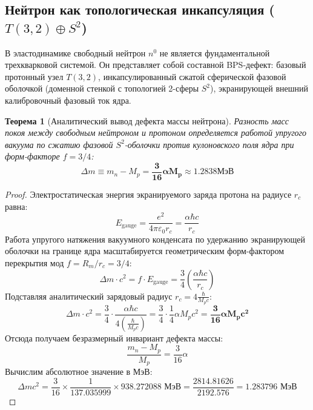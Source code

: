 \documentclass[12pt,a4paper]{article}
\newtheorem{theorem}{Теорема}
\begin{document}
\subsection{Нейтрон как топологическая инкапсуляция ($T(3,2) \oplus S^2$)}
В эластодинамике свободный нейтрон $n^0$ не является фундаментальной трехкварковой системой. Он представляет собой составной BPS-дефект: базовый протонный узел $T(3,2)$, инкапсулированный сжатой сферической фазовой оболочкой (доменной стенкой с топологией 2-сферы $S^2$), экранирующей внешний калибровочный фазовый ток ядра.

\begin{theorem}[Аналитический вывод дефекта массы нейтрона]
	Разность масс покоя между свободным нейтроном и протоном определяется работой упругого вакуума по сжатию фазовой $S^2$-оболочки против кулоновского поля ядра при форм-факторе $f = 3/4$:
	\begin{equation}
		\Delta m \equiv m_n - M_p = \mathbf{\frac{3}{16} \alpha M_p} \approx \mathbf{1.2838 \mathrm{ МэВ}}
	\end{equation}
\end{theorem}

\begin{proof}
	Электростатическая энергия экранируемого заряда протона на радиусе $r_c$ равна:
	\begin{equation}
		E_{\text{gauge}} = \frac{e^2}{4\pi \varepsilon_0 r_c} = \frac{\alpha \hbar c}{r_c}
	\end{equation}
	Работа упругого натяжения вакуумного конденсата по удержанию экранирующей оболочки на границе ядра масштабируется геометрическим форм-фактором перекрытия мод $f = R_m / r_c = 3/4$:
	\begin{equation}
		\Delta m \cdot c^2 = f \cdot E_{\text{gauge}} = \frac{3}{4} \left( \frac{\alpha \hbar c}{r_c} \right)
	\end{equation}
	Подставляя аналитический зарядовый радиус $r_c = 4 \frac{\hbar}{M_p c}$:
	\begin{equation}
		\Delta m \cdot c^2 = \frac{3}{4} \cdot \frac{\alpha \hbar c}{4 \left( \frac{\hbar}{M_p c} \right)} = \frac{3}{4} \cdot \frac{1}{4} \alpha M_p c^2 = \mathbf{\frac{3}{16} \alpha M_p c^2}
	\end{equation}
	Отсюда получаем безразмерный инвариант дефекта массы:
	\begin{equation}
		\frac{m_n - M_p}{M_p} = \frac{3}{16} \alpha
	\end{equation}
	Вычислим абсолютное значение в МэВ:
	\begin{equation}
		\Delta m c^2 = \frac{3}{16} \times \frac{1}{137.035999} \times 938.272088 \text{ МэВ} = \frac{2814.81626}{2192.576} = \mathbf{1.283796 \text{ МэВ}}
	\end{equation}
\end{proof}
\end{document}

